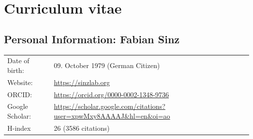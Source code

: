 \documentclass[COG,11pt]{ercgrant}
\begin{document}



\begin{small}
\printbibliography
\end{small}

% 	
% 	

\newpage
\section{Curriculum vitae}

\subsection{Personal Information: Fabian Sinz}
\begin{tabular}{p{3cm}l}
	Date of birth:         & 09. October 1979 (German Citizen)     \\
	Website:               & \url{https://sinzlab.org}     \\
	ORCID:                 &  \url{https://orcid.org/0000-0002-1348-9736}      \\
        Google Scholar:         & \url{https://scholar.google.com/citations?user=xpwMxy8AAAAJ&hl=en&oi=ao}\\
        H-index  & 26 (3586 citations)
\end{tabular}
\end{document}
